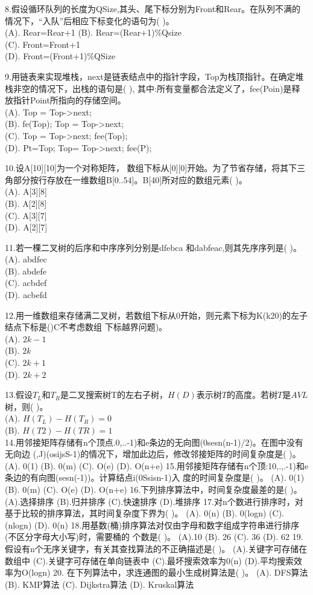 8.假设循环队列的长度为QSize,其头、尾下标分别为Front和Rear。在队列不满的情况下，“入队”后相应下标变化的语句为( )。 \\
(A). Rear=Rear+1
(B). Rear=(Rear+1)\%Qsize \\
(C). Front=Front+1 \\
(D). Front=(Front+1)\%QSize

9.用链表来实现堆栈，next是链表结点中的指针字段，Top为栈顶指针。在确定堆栈非空的情况下，出栈的语句是( ), 其中:所有变量都合法定义了，fee(Poin)是释 放指针Point所指向的存储空间。  \\
(A). Top = Top->next; \\
(B). fe(Top); Top = Top->next; \\
(C). Top = Top->next; fee(Top); \\
(D). Pt=Top; Top= Top->next; fee(P);

10.设A[10][10]为一个对称矩阵， 数组下标从[0][0]开始。为了节省存储，将其下三角部分按行存放在一维数组B[0..54]。B[40]所对应的数组元素( )。 \\
(A). A[3][8] \\
(B). A[2][8] \\
(C). A[3][7] \\
(D). A[2][7]

11.若一棵二叉树的后序和中序序列分别是dfebca 和dabfeac,则其先序序列是( )。 \\
(A). abdfec \\
(B). abdefe \\
(C). acbdef \\
(D). acbefd

12.用一维数组来存储满二叉树，若数组下标从0开始，则元素下标为K(k20)的左子结点下标是()C不考虑数组 下标越界问题)。 \\
(A). $2k-1$ \\
(B). $2k$ \\
(C). $2k+1$ \\
(D). $2k+2$

13.假设$T_L$和$T_R$是二叉搜索树T的左右子树，$H(D)$表示树$T$的高度。若树$T$是$AVL$树，则( )。 \\
(A). $H(T_L)-H(T_R)=0$ \\
(B). $H(T2)- H(TR)=1$ \\

14.用邻接矩阵存储有n个顶点.0,..-1)和e条边的无向图(0sesn(n-1)/2)。在图中没有无向边
(,J)(osijsS-1)的情况下，增加此边后，修改邻接矩阵的时间复杂度是( )。
(A). 0(1)
(B). 0(m)
(C). O(e)
(D). O(n+e)
15.用邻接矩阵存储有n个顶:10,.,.-1)和e条边的有向图(sesn(-1))。计算结点i(0Ssisn-1)入
度的时间复杂度是( )。
(A). 0(1)
(B). 0(m)
(C). O(e)
(D). O(n+e)
16.下列排序算法中，时间复杂度最差的是( )。
(A).选择排序
(B).归并排序
(C).快速排序
(D).堆排序
17.对n个数进行排序时，对基于比较的排序算法，其时间复杂度下界为( )。
(A). 0(n)
(B). 0(logn)
(C). (nlogn)
(D). 0(n)
18.用基数(桶)排序算法对仅由字母和数字组成字符串进行排序(不区分字母大小写)时，需要桶的
个数是( )。
(A).10
(B). 26
(C). 36
(D). 62
19.假设有n个无序关键字，有关其查找算法的不正确描述是( )。
(A).关键字可存储在数组中
(C).关键字可存储在单向链表中
(C).最坏搜索效率为0(n)
(D).平均搜索效率为O(logn)
20. 在下列算法中，求连通图的最小生成树算法是( )。
(A). DFS算法
(B). KMP算法
(C). Dijkstra算法
(D). Kruskal算法
